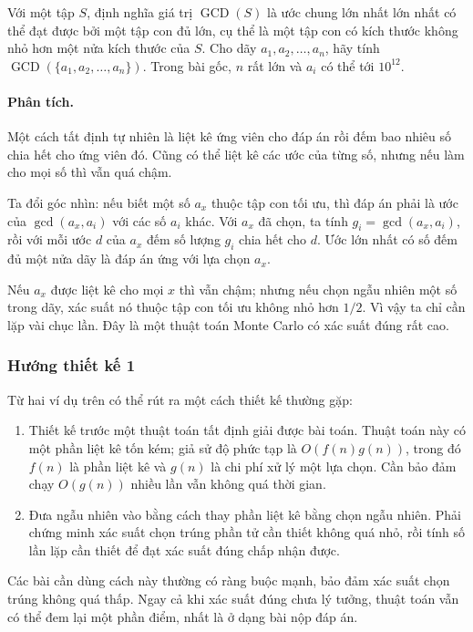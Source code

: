 \documentclass[11pt]{article}
\begin{document}
Với một tập \(S\), định nghĩa giá trị \(\operatorname{GCD}(S)\) là ước chung lớn
nhất lớn nhất có thể đạt được bởi một tập con đủ lớn, cụ thể là một tập con có
kích thước không nhỏ hơn một nửa kích thước của \(S\). Cho dãy
\(a_1,a_2,\ldots,a_n\), hãy tính \(\operatorname{GCD}(\{a_1,a_2,\ldots,a_n\})\).
Trong bài gốc, \(n\) rất lớn và \(a_i\) có thể tới \(10^{12}\).

\paragraph{Phân tích.}
Một cách tất định tự nhiên là liệt kê ứng viên cho đáp án rồi đếm bao nhiêu số
chia hết cho ứng viên đó. Cũng có thể liệt kê các ước của từng số, nhưng nếu làm
cho mọi số thì vẫn quá chậm.

Ta đổi góc nhìn: nếu biết một số \(a_x\) thuộc tập con tối ưu, thì đáp án phải
là ước của \(\gcd(a_x,a_i)\) với các số \(a_i\) khác. Với \(a_x\) đã chọn, ta
tính \(g_i=\gcd(a_x,a_i)\), rồi với mỗi ước \(d\) của \(a_x\) đếm số lượng
\(g_i\) chia hết cho \(d\). Ước lớn nhất có số đếm đủ một nửa dãy là đáp án ứng
với lựa chọn \(a_x\).

Nếu \(a_x\) được liệt kê cho mọi \(x\) thì vẫn chậm; nhưng nếu chọn ngẫu nhiên
một số trong dãy, xác suất nó thuộc tập con tối ưu không nhỏ hơn \(1/2\). Vì vậy
ta chỉ cần lặp vài chục lần. Đây là một thuật toán Monte Carlo có xác suất đúng
rất cao.

\subsubsection{Hướng thiết kế 1}

Từ hai ví dụ trên có thể rút ra một cách thiết kế thường gặp:
\begin{enumerate}
  \item Thiết kế trước một thuật toán tất định giải được bài toán. Thuật toán
  này có một phần liệt kê tốn kém; giả sử độ phức tạp là
  \(O(f(n)g(n))\), trong đó \(f(n)\) là phần liệt kê và \(g(n)\) là chi phí xử
  lý một lựa chọn. Cần bảo đảm chạy \(O(g(n))\) nhiều lần vẫn không quá thời
  gian.
  \item Đưa ngẫu nhiên vào bằng cách thay phần liệt kê bằng chọn ngẫu nhiên.
  Phải chứng minh xác suất chọn trúng phần tử cần thiết không quá nhỏ, rồi tính
  số lần lặp cần thiết để đạt xác suất đúng chấp nhận được.
\end{enumerate}

Các bài cần dùng cách này thường có ràng buộc mạnh, bảo đảm xác suất chọn trúng
không quá thấp. Ngay cả khi xác suất đúng chưa lý tưởng, thuật toán vẫn có thể
đem lại một phần điểm, nhất là ở dạng bài nộp đáp án.
\end{document}
